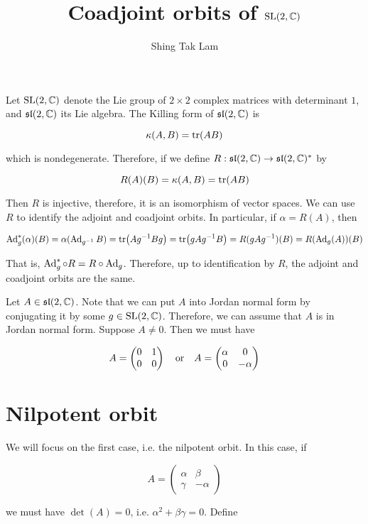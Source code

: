 \documentclass{article}
\title{Coadjoint orbits of \(\operatorname{SL}(2, \mathbb{C})\)}
\author{Shing Tak Lam}
\renewcommand{\sl}{\mfs\mfl}
\begin{document}
\maketitle

Let \(\operatorname{SL}(2, \mathbb{C})\) denote the Lie group of \(2 \times 2\) complex matrices with determinant \(1\), and \(\sl(2, \C)\) its Lie algebra. The Killing form of \(\sl(2,\C)\) is

\[\kappa(A, B) = \tr(AB)\]

which is nondegenerate. Therefore, if we define \(R : \sl(2, \C) \to \sl(2, \C)^*\) by

\[R(A)(B) = \kappa(A, B) = \tr(AB)\]

Then \(R\) is injective, therefore, it is an isomorphism of vector spaces. We can use \(R\) to identify the adjoint and coadjoint orbits. In particular, if \(\alpha = R(A)\), then

\[\operatorname{Ad}_g^*(\alpha)(B) = \alpha(\operatorname{Ad}_{g^{-1}}B) = \tr(Ag^{-1}Bg) = \tr(gAg^{-1}B) = R(gAg^{-1})(B) = R(\operatorname{Ad}_g(A))(B)\]

That is, \(\operatorname{Ad}_g^* \circ R = R \circ \operatorname{Ad}_g\). Therefore, up to identification by \(R\), the adjoint and coadjoint orbits are the same.

Let \(A \in \sl(2, \C)\). Note that we can put \(A\) into Jordan normal form by conjugating it by some \(g \in \operatorname{SL}(2, \mathbb{C})\). Therefore, we can assume that \(A\) is in Jordan normal form. Suppose \(A \ne 0\). Then we must have

\[A = \begin{pmatrix}
    0 & 1 \\ 0 & 0 
\end{pmatrix}\qqtext{or}A = \begin{pmatrix}
    \alpha & 0 \\ 0 & -\alpha
\end{pmatrix}\]

\section{Nilpotent orbit}

We will focus on the first case, i.e. the nilpotent orbit. In this case, if

\[A = \begin{pmatrix}
    \alpha & \beta \\ \gamma & -\alpha
\end{pmatrix}\]

we must have \(\det(A) = 0\), i.e. \(\alpha^2 + \beta\gamma = 0\). Define
\end{document}
